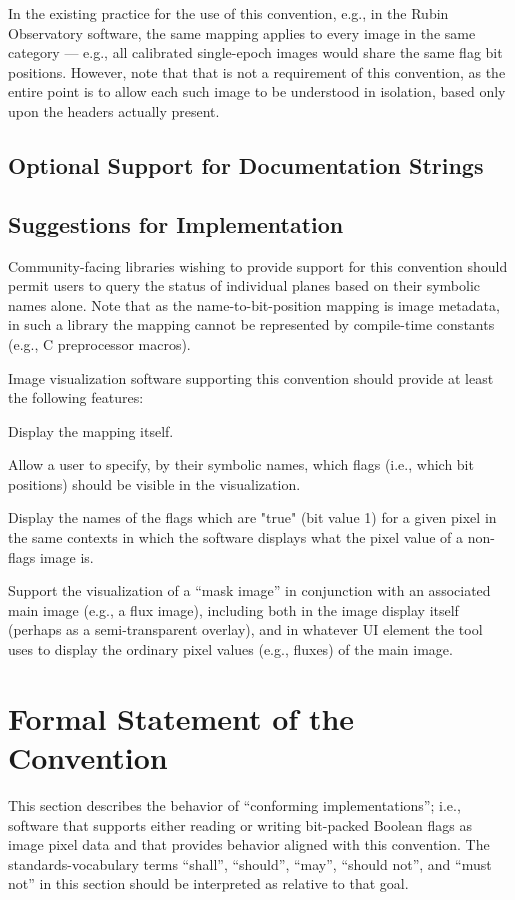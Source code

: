 \documentclass[DM,authoryear,toc]{lsstdoc}
\begin{document}
In the existing practice for the use of this convention,
e.g., in the Rubin Observatory software, the same mapping applies
to every image in the same category --- e.g., all calibrated
single-epoch images would share the same flag bit positions.
However, note that that is not a requirement of this convention,
as the entire point is to allow each such image to be understood
in isolation, based only upon the headers actually present.


\subsection{Optional Support for Documentation Strings}

\subsection{Suggestions for Implementation}

Community-facing libraries wishing to provide support for this
convention should permit users to query the status of individual
planes based on their symbolic names alone.
Note that as the name-to-bit-position mapping is image metadata,
in such a library the mapping cannot be represented by compile-time
constants (e.g., C preprocessor macros).

Image visualization software supporting this convention should
provide at least the following features:

Display the mapping itself.

Allow a user to specify, by their symbolic names, which flags
(i.e., which bit positions) should be visible in the visualization.

Display the names of the flags which are "true" (bit value 1)
for a given pixel in the same contexts in which the software
displays what the pixel value of a non-flags image is.

Support the visualization of a ``mask image'' in conjunction
with an associated main image (e.g., a flux image), including
both in the image display itself (perhaps as a semi-transparent
overlay), and in whatever UI element the tool uses to display
the ordinary pixel values (e.g., fluxes) of the main image.

\section{Formal Statement of the Convention}

This section describes the behavior of ``conforming implementations'';
i.e., software that supports either reading or writing bit-packed
Boolean flags as image pixel data and that provides behavior aligned
with this convention.
The standards-vocabulary terms ``shall'', ``should'', ``may'',
``should  not'', and ``must not'' in this section should be interpreted
as relative to that goal.
\end{document}
